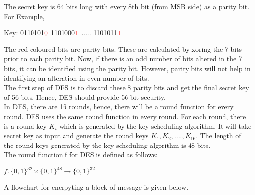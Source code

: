 \documentclass[11pt]{article}
\begin{document}
The secret key is 64 bits long with every 8th bit (from MSB side) as a parity bit. For Example, 
\begin{center}
    Key: 0110101$\textcolor{red}{0}$ 1101000$\textcolor{red}{1}$ ..... 1101011$\textcolor{red}{1}$
\end{center}
The red coloured bits are parity bits. These are calculated by xoring the 7 bits prior to each parity bit. Now, if there is an odd number of bits altered in the 7 bits, it can be identified using the parity bit. However, parity bits will not help in identifying an alteration in even number of bits.\\
\newline
The first step of DES is to discard these 8 parity bits and get the final secret key of 56 bits. Hence, DES should provide 56 bit security.\\
\newline
In DES, there are 16 rounds, hence, there will be a round function for every round. DES uses the same round function in every round. For each round, there is a round key $K_i$ which is generated by the key scheduling algorithm. It will take secret key as input and generate the round keys $K_1, K_2, ...., K_{16}$. The length of the round keys generated by the key scheduling algorithm is 48 bits.\\

The round function f for DES is defined as follows:
\begin{center}
    $f: \{0,1\}^{32} \times \{0,1\}^{48} \rightarrow \{0,1\}^{32}$
\end{center}
A flowchart for encrpyting a block of message is given below.
\end{document}
